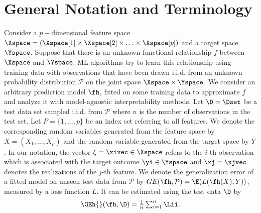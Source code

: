 \section{General Notation and Terminology}
\label{sec:notation}

Consider a $p-$dimensional feature space $\Xspace = (\Xspace[1] \times \Xspace[2] \times \hdots \times \Xspace[p])$ %
and a target space $\Yspace$.
Suppose that there is an unknown functional relationship $f$ between $\Xspace$ and $\Yspace$.
ML algorithms try to learn this relationship using training data with observations that have been drawn i.i.d. from an unknown probability distribution $\mathcal{P}$ on the joint space $\Xspace \times \Yspace$.
We consider an arbitrary prediction model $\fh$, fitted on some training data to approximate $f$ and analyze it with model-agnostic interpretability methods.
Let $\D = \Dset$ be a test data set sampled i.i.d. from $\mathcal{P}$ where $n$ is the number of observations in the test set.
Let $P = \{1, \hdots, p\}$ be an index set referring to all features.
We denote the corresponding random variables generated from the feature space by $X = (X_1, \hdots, X_p)$ and the random variable generated from the target space by $Y$.
In our notation, the vector $\xi = \xivec \in \Xspace$ refers to the $i$-th observation which is associated with the target outcome $\yi \in \Yspace$ and $\xj = \xjvec$ denotes the realizations of the $j$-th feature.
We denote the generalization error of a fitted model on unseen test data from $\mathcal{P}$ by $GE(\fh, \mathcal{P}) = \E(L(\fh(X), Y))$, measured by a loss function $L$.
It can be estimated using the test data $\D$ by %
\begin{equation}
\label{eq:geest}
\textstyle \GEh{}(\fh, \D) = \frac 1 n \sum_{i=1}^n \Lii.
\end{equation}

